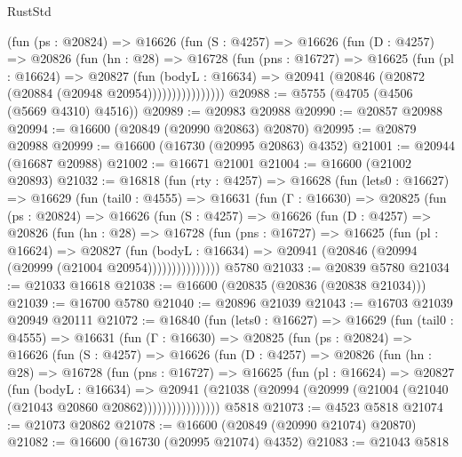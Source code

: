 \begin{lexlean}{RustStd}
\begin{coremodule}
              (fun (ps : @20824) =>
              @16626
                (fun (S : @4257) =>
                @16626
                  (fun (D : @4257) =>
                  @20826
                    (fun (hn : @28) =>
                    @16728
                      (fun (pns : @16727) =>
                      @16625
                        (fun (pl : @16624) =>
                        @20827
                          (fun (bodyL : @16634) =>
                          @20941 (@20846 (@20872 (@20884 (@20948 @20954))))))))))))))))
@20988 := @5755 (@4705 (@4506 (@5669 @4310) @4516))
@20989 := @20983 @20988
@20990 := @20857 @20988
@20994 := @16600 (@20849 (@20990 @20863) @20870)
@20995 := @20879 @20988
@20999 := @16600 (@16730 (@20995 @20863) @4352)
@21001 := @20944 (@16687 @20988)
@21002 := @16671 @21001
@21004 := @16600 (@21002 @20893)
@21032 := @16818
    (fun (rty : @4257) =>
    @16628
      (fun (lets0 : @16627) =>
      @16629
        (fun (tail0 : @4555) =>
        @16631
          (fun (Γ : @16630) =>
          @20825
            (fun (ps : @20824) =>
            @16626
              (fun (S : @4257) =>
              @16626
                (fun (D : @4257) =>
                @20826
                  (fun (hn : @28) =>
                  @16728
                    (fun (pns : @16727) =>
                    @16625
                      (fun (pl : @16624) =>
                      @20827
                        (fun (bodyL : @16634) =>
                        @20941 (@20846 (@20994 (@20999 (@21004 @20954)))))))))))))))
    @5780
@21033 := @20839 @5780
@21034 := @21033 @16618
@21038 := @16600 (@20835 (@20836 (@20838 @21034)))
@21039 := @16700 @5780
@21040 := @20896 @21039
@21043 := @16703 @21039 @20949 @20111
@21072 := @16840
    (fun (lets0 : @16627) =>
    @16629
      (fun (tail0 : @4555) =>
      @16631
        (fun (Γ : @16630) =>
        @20825
          (fun (ps : @20824) =>
          @16626
            (fun (S : @4257) =>
            @16626
              (fun (D : @4257) =>
              @20826
                (fun (hn : @28) =>
                @16728
                  (fun (pns : @16727) =>
                  @16625
                    (fun (pl : @16624) =>
                    @20827
                      (fun (bodyL : @16634) =>
                      @20941
                        (@21038
                          (@20994 (@20999 (@21004 (@21040 (@21043 @20860 @20862))))))))))))))))
    @5818
@21073 := @4523 @5818
@21074 := @21073 @20862
@21078 := @16600 (@20849 (@20990 @21074) @20870)
@21082 := @16600 (@16730 (@20995 @21074) @4352)
@21083 := @21043 @5818

\end{coremodule}
\end{lexlean}
